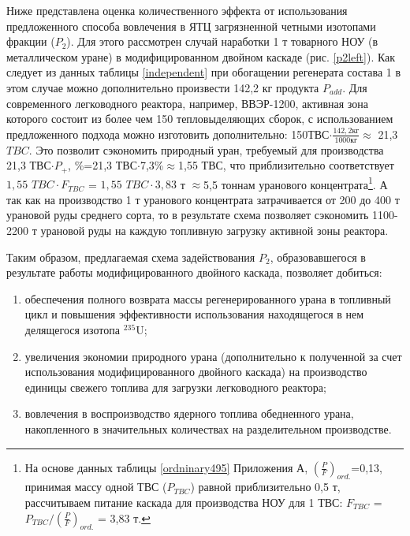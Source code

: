 Ниже представлена оценка количественного эффекта от использования предложенного способа вовлечения в ЯТЦ загрязненной четными изотопами фракции ($P_2$). Для этого рассмотрен случай наработки 1 т товарного НОУ (в металлическом уране) в модифицированном двойном каскаде (рис. \ref{p2left}). Как следует из данных таблицы \ref{independent} при обогащении регенерата состава 1 в этом случае можно дополнительно произвести 142,2 кг продукта $P_{add}$. Для современного легководного реактора, например, ВВЭР-1200, активная зона которого состоит из более чем 150 тепловыделяющих сборок, с использованием предложенного подхода можно изготовить дополнительно: 150$ $ТВС$\cdot \frac{142,2 \textit{кг}}{1000 \textit{кг}}\approx$ 21,3 $TBC$. Это позволит сэкономить природный уран, требуемый для производства 21,3 ТВС$\cdot P_{+}$, \%=21,3 ТВС$\cdot$7,3\%$\approx$1,55 ТВС, что приблизительно соответствует $1,55$  $TBC \cdot F_{TBC}$ = $1,55$ $TBC\cdot 3,83$ т $\approx$5,5 тоннам уранового концентрата\footnote{На основе данных таблицы \ref{ordninary495} Приложения А, $(\frac{P}{F})_{ord.}$=0,13,  принимая массу одной ТВС ($P_{TBC}$) равной приблизительно 0,5 т, рассчитываем питание каскада для производства НОУ для 1 ТВС: $F_{TBC}$ = $P_{TBC}/(\frac{P}{F})_{ord.}$ = 3,83 т.}. А так как на производство 1 т уранового концентрата затрачивается от 200 до 400 т урановой руды \cite{bekmanYaDERNAYaFIZIKA} среднего сорта, то в результате схема позволяет сэкономить 1100-2200 т урановой руды на каждую топливную загрузку активной зоны реактора.


Таким образом, предлагаемая схема задействования $P_2$, образовавшегося в результате работы модифицированного двойного каскада, позволяет добиться:
\begin{enumerate}
  \item обеспечения полного возврата массы регенерированного урана в топливный цикл и повышения эффективности использования находящегося в нем делящегося изотопа $^{235}$U;
  \item увеличения экономии природного урана (дополнительно к полученной за счет использования модифицированного двойного каскада)  на производство единицы свежего топлива для загрузки легководного реактора;
  \item вовлечения в воспроизводство ядерного топлива обедненного урана, накопленного в значительных количествах на разделительном производстве.
\end{enumerate}


